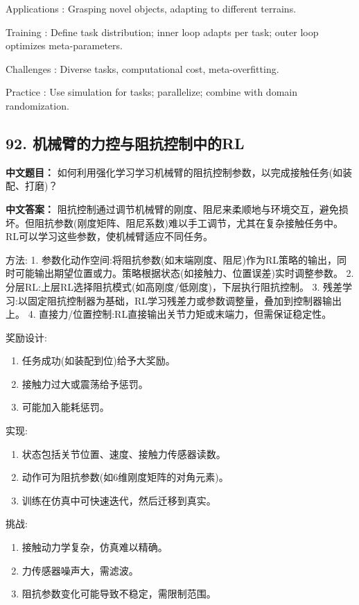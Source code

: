 \documentclass[10pt,a4paper]{ctexart}
\begin{document}
 Applications : Grasping novel objects, adapting to different terrains.

 Training : Define task distribution; inner loop adapts per task; outer loop optimizes meta-parameters.

 Challenges : Diverse tasks, computational cost, meta-overfitting.

 Practice : Use simulation for tasks; parallelize; combine with domain randomization.

\subsection*{92. 机械臂的力控与阻抗控制中的RL}
\textbf{中文题目：} 如何利用强化学习学习机械臂的阻抗控制参数，以完成接触任务(如装配、打磨)？

\textbf{中文答案：}  
阻抗控制通过调节机械臂的刚度、阻尼来柔顺地与环境交互，避免损坏。但阻抗参数(刚度矩阵、阻尼系数)难以手工调节，尤其在复杂接触任务中。RL可以学习这些参数，使机械臂适应不同任务。

 方法:
1.  参数化动作空间:将阻抗参数(如末端刚度、阻尼)作为RL策略的输出，同时可能输出期望位置或力。策略根据状态(如接触力、位置误差)实时调整参数。
2.  分层RL:上层RL选择阻抗模式(如高刚度/低刚度)，下层执行阻抗控制。
3.  残差学习:以固定阻抗控制器为基础，RL学习残差力或参数调整量，叠加到控制器输出上。
4.  直接力/位置控制:RL直接输出关节力矩或末端力，但需保证稳定性。

 奖励设计:
\begin{enumerate}
    \item 任务成功(如装配到位)给予大奖励。
    \item 接触力过大或震荡给予惩罚。
    \item 可能加入能耗惩罚。
\end{enumerate}

 实现:
\begin{enumerate}
    \item 状态包括关节位置、速度、接触力传感器读数。
    \item 动作可为阻抗参数(如6维刚度矩阵的对角元素)。
    \item 训练在仿真中可快速迭代，然后迁移到真实。
\end{enumerate}

 挑战:
\begin{enumerate}
    \item 接触动力学复杂，仿真难以精确。
    \item 力传感器噪声大，需滤波。
    \item 阻抗参数变化可能导致不稳定，需限制范围。
\end{enumerate}
\end{document}
